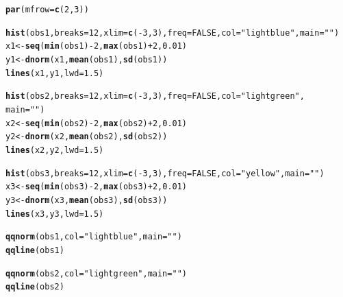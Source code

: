 \documentclass{report}\usepackage[]{graphicx}\usepackage[]{color}
\makeatletter
\newcommand{\hlnum}[1]{\textcolor[rgb]{0.686,0.059,0.569}{#1}}%
\newcommand{\hlstr}[1]{\textcolor[rgb]{0.192,0.494,0.8}{#1}}%
\newcommand{\hlopt}[1]{\textcolor[rgb]{0,0,0}{#1}}%
\newcommand{\hlstd}[1]{\textcolor[rgb]{0.345,0.345,0.345}{#1}}%
\newcommand{\hlkwb}[1]{\textcolor[rgb]{0.69,0.353,0.396}{#1}}%
\newcommand{\hlkwc}[1]{\textcolor[rgb]{0.333,0.667,0.333}{#1}}%
\newcommand{\hlkwd}[1]{\textcolor[rgb]{0.737,0.353,0.396}{\textbf{#1}}}%
\newenvironment{kframe}{%
 \def\at@end@of@kframe{}%
 \ifinner\ifhmode%
  \def\at@end@of@kframe{\end{minipage}}%
  \begin{minipage}{\columnwidth}%
 \fi\fi%
 \def\FrameCommand##1{\hskip\@totalleftmargin \hskip-\fboxsep
 \colorbox{shadecolor}{##1}\hskip-\fboxsep
     \hskip-\linewidth \hskip-\@totalleftmargin \hskip\columnwidth}%
 \MakeFramed {\advance\hsize-\width
   \@totalleftmargin\z@ \linewidth\hsize
   \@setminipage}}%
 {\par\unskip\endMakeFramed%
 \at@end@of@kframe}
\newenvironment{knitrout}{}{} %
\makeatother
\begin{document}
\begin{knitrout}
\begin{kframe}
\begin{alltt}
\hlkwd{par}\hlstd{(}\hlkwc{mfrow} \hlstd{=} \hlkwd{c}\hlstd{(}\hlnum{2}\hlstd{,} \hlnum{3}\hlstd{))}

\hlkwd{hist}\hlstd{(obs1,} \hlkwc{breaks} \hlstd{=} \hlnum{12}\hlstd{,} \hlkwc{xlim} \hlstd{=} \hlkwd{c}\hlstd{(}\hlopt{-}\hlnum{3}\hlstd{,} \hlnum{3}\hlstd{),} \hlkwc{freq} \hlstd{=} \hlnum{FALSE}\hlstd{,} \hlkwc{col} \hlstd{=} \hlstr{"light blue"}\hlstd{,} \hlkwc{main} \hlstd{=} \hlstr{" "}\hlstd{)}
\hlstd{x1} \hlkwb{<-} \hlkwd{seq}\hlstd{(}\hlkwd{min}\hlstd{(obs1)} \hlopt{-} \hlnum{2}\hlstd{,} \hlkwd{max}\hlstd{(obs1)} \hlopt{+} \hlnum{2}\hlstd{,} \hlnum{0.01}\hlstd{)}
\hlstd{y1} \hlkwb{<-} \hlkwd{dnorm}\hlstd{(x1,} \hlkwd{mean}\hlstd{(obs1),} \hlkwd{sd}\hlstd{(obs1))}
\hlkwd{lines}\hlstd{(x1, y1,} \hlkwc{lwd} \hlstd{=} \hlnum{1.5}\hlstd{)}

\hlkwd{hist}\hlstd{(obs2,} \hlkwc{breaks} \hlstd{=} \hlnum{12}\hlstd{,} \hlkwc{xlim} \hlstd{=} \hlkwd{c}\hlstd{(}\hlopt{-}\hlnum{3}\hlstd{,} \hlnum{3}\hlstd{),} \hlkwc{freq} \hlstd{=} \hlnum{FALSE}\hlstd{,} \hlkwc{col} \hlstd{=} \hlstr{"light green"}\hlstd{,}
    \hlkwc{main} \hlstd{=} \hlstr{" "}\hlstd{)}
\hlstd{x2} \hlkwb{<-} \hlkwd{seq}\hlstd{(}\hlkwd{min}\hlstd{(obs2)} \hlopt{-} \hlnum{2}\hlstd{,} \hlkwd{max}\hlstd{(obs2)} \hlopt{+} \hlnum{2}\hlstd{,} \hlnum{0.01}\hlstd{)}
\hlstd{y2} \hlkwb{<-} \hlkwd{dnorm}\hlstd{(x2,} \hlkwd{mean}\hlstd{(obs2),} \hlkwd{sd}\hlstd{(obs2))}
\hlkwd{lines}\hlstd{(x2, y2,} \hlkwc{lwd} \hlstd{=} \hlnum{1.5}\hlstd{)}

\hlkwd{hist}\hlstd{(obs3,} \hlkwc{breaks} \hlstd{=} \hlnum{12}\hlstd{,} \hlkwc{xlim} \hlstd{=} \hlkwd{c}\hlstd{(}\hlopt{-}\hlnum{3}\hlstd{,} \hlnum{3}\hlstd{),} \hlkwc{freq} \hlstd{=} \hlnum{FALSE}\hlstd{,} \hlkwc{col} \hlstd{=} \hlstr{"yellow"}\hlstd{,} \hlkwc{main} \hlstd{=} \hlstr{" "}\hlstd{)}
\hlstd{x3} \hlkwb{<-} \hlkwd{seq}\hlstd{(}\hlkwd{min}\hlstd{(obs3)} \hlopt{-} \hlnum{2}\hlstd{,} \hlkwd{max}\hlstd{(obs3)} \hlopt{+} \hlnum{2}\hlstd{,} \hlnum{0.01}\hlstd{)}
\hlstd{y3} \hlkwb{<-} \hlkwd{dnorm}\hlstd{(x3,} \hlkwd{mean}\hlstd{(obs3),} \hlkwd{sd}\hlstd{(obs3))}
\hlkwd{lines}\hlstd{(x3, y3,} \hlkwc{lwd} \hlstd{=} \hlnum{1.5}\hlstd{)}

\hlkwd{qqnorm}\hlstd{(obs1,} \hlkwc{col} \hlstd{=} \hlstr{"light blue"}\hlstd{,} \hlkwc{main} \hlstd{=} \hlstr{" "}\hlstd{)}
\hlkwd{qqline}\hlstd{(obs1)}

\hlkwd{qqnorm}\hlstd{(obs2,} \hlkwc{col} \hlstd{=} \hlstr{"light green"}\hlstd{,} \hlkwc{main} \hlstd{=} \hlstr{" "}\hlstd{)}
\hlkwd{qqline}\hlstd{(obs2)}


\end{alltt}
\end{kframe}
\end{knitrout}
\end{document}
